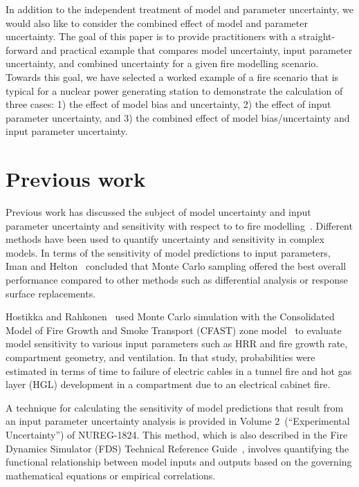 \documentclass[12pt]{article}
\begin{document}
In addition to the independent treatment of model and parameter uncertainty, we would also like to consider the combined effect of model and parameter uncertainty. The goal of this paper is to provide practitioners with a straight-forward and practical example that compares model uncertainty, input parameter uncertainty, and combined uncertainty for a given fire modelling scenario. Towards this goal, we have selected a worked example of a fire scenario that is typical for a nuclear power generating station to demonstrate the calculation of three cases: 1) the effect of model bias and uncertainty, 2) the effect of input parameter uncertainty, and 3) the combined effect of model bias/uncertainty and input parameter uncertainty. 


\section{Previous work}
\label{sec:previous_work}

Previous work has discussed the subject of model uncertainty and input parameter uncertainty and sensitivity with respect to to fire modelling~\cite{Notarianni:SFPE, NUREG_1824, McGrattan2011a, Notarianni:1999, Lundin, Hostikka:2003a, Upadhyay2008, FDS_Validation_Guide}. Different methods have been used to quantify uncertainty and sensitivity in complex models. In terms of the sensitivity of model predictions to input parameters, Iman and Helton~\cite{Iman:1988} concluded that Monte Carlo sampling offered the best overall performance compared to other methods such as differential analysis or response surface replacements.

Hostikka and Rahkonen~\cite{Hostikka:2003a} used Monte Carlo simulation with the Consolidated Model of Fire Growth and Smoke Transport (CFAST) zone model~\cite{CFAST_Tech_Guide_6, CFAST_Users_Guide_6} to evaluate model sensitivity to various input parameters such as HRR and fire growth rate, compartment geometry, and ventilation. In that study, probabilities were estimated in terms of time to failure of electric cables in a tunnel fire and hot gas layer (HGL) development in a compartment due to an electrical cabinet fire. 

A technique for calculating the sensitivity of model predictions that result from an input parameter uncertainty analysis is provided in Volume 2~(``Experimental Uncertainty'') of NUREG-1824. This method, which is also described in the Fire Dynamics Simulator (FDS) Technical Reference Guide~\cite{FDS_Validation_Guide}, involves quantifying the functional relationship between model inputs and outputs based on the governing mathematical equations or empirical correlations. 
\end{document}
